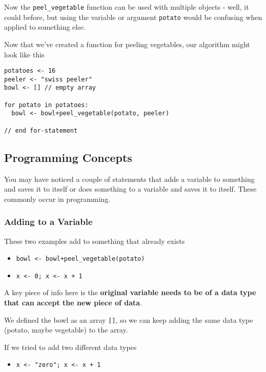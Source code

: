 \documentclass[
]{book}
\providecommand{\tightlist}{%
  \setlength{\itemsep}{0pt}\setlength{\parskip}{0pt}}
\begin{document}
Now the \texttt{peel\_vegetable} function can be used with multiple objects - well, it could before, but using the variable or argument \texttt{potato} would be confusing when applied to something else.

Now that we've created a function for peeling vegetables, our algorithm might look like this

\begin{verbatim}
potatoes <- 16
peeler <- "swiss peeler"
bowl <- [] // empty array

for potato in potatoes:
  bowl <- bowl+peel_vegetable(potato, peeler)

// end for-statement  
\end{verbatim}

\subsection{Programming Concepts}\label{programming-concepts}

You may have noticed a couple of statements that adds a variable to something and saves it to itself or does something to a variable and saves it to itself. These commonly occur in programming.

\subsubsection{Adding to a Variable}\label{adding-to-a-variable}

These two examples add to something that already exists

\begin{itemize}
\tightlist
\item
  \texttt{bowl\ \textless{}-\ bowl+peel\_vegetable(potato)}
\item
  \texttt{x\ \textless{}-\ 0;\ x\ \textless{}-\ x\ +\ 1}
\end{itemize}

A key piece of info here is the \textbf{original variable needs to be of a data type that can accept the new piece of data}.~

We defined the bowl as an array \texttt{{[}{]}}, so we can keep adding the same data type (potato, maybe vegetable) to the array.~

If we tried to add two different data types

\begin{itemize}
\tightlist
\item
  \texttt{x\ \textless{}-\ "zero";\ x\ \textless{}-\ x\ +\ 1}
\end{itemize}
\end{document}
